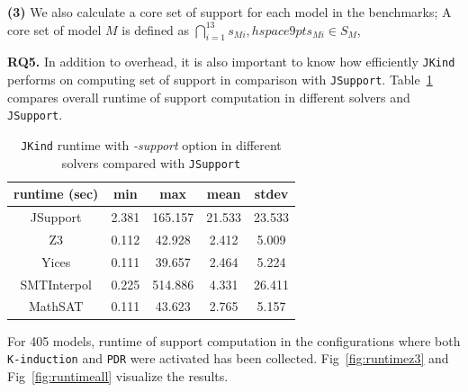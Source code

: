 \noindent{}
 \vspace{9pt}

\textbf{(3)}
We also calculate a core set of support for each model in the benchmarks; A core set of model $M$ is defined as
$\bigcap_{i=1}^{13} s_{Mi},   hspace{9pt} s_{Mi} \in S_M$, 




\textbf{RQ5.} In addition to overhead, it is also important to know how efficiently \texttt{JKind} performs on computing set of support in comparison with \texttt{JSupport}. Table~\ref{tab:eff-comp-jsup} compares overall runtime of support computation in different solvers and \texttt{JSupport}.

\begin{table}
  \centering
  \begin{tabular}{ |c||c|c|c|c| }
    \hline
     runtime (sec) & min & max & mean & stdev \\[0.5ex]
    \hline\hline
    JSupport & 2.381 & 165.157 & 21.533 & 23.533 \\[0.5ex]
    Z3   & 0.112 & 42.928 & 2.412 & 5.009 \\[0.5ex]
    Yices &   0.111  & 39.657   & 2.464 & 5.224 \\[0.5ex]
    SMTInterpol& 0.225 & 514.886 &  4.331 & 26.411 \\[0.5ex]
    MathSAT & 0.111 & 43.623 &  2.765 & 5.157 \\[0.5ex]
    \hline
  \end{tabular}
  \caption{\small{\texttt{JKind} runtime with \emph{-support} option in different solvers compared with \texttt{JSupport}}}
  \label{tab:eff-comp-jsup}
\end{table}

For 405 models, runtime of support computation in the configurations where both \texttt{K-induction} and \texttt{PDR} were activated has been collected. Fig~\ref{fig:runtimez3} and Fig~\ref{fig:runtimeall} visualize the results.

